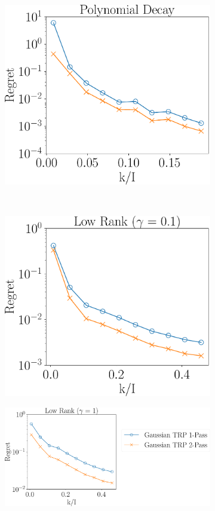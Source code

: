 \begin{figure}
\begin{subfigure}{0.3\textwidth}
		\includegraphics[scale = 0.24]{figure/fig3_spd_600.pdf}
	\end{subfigure}\\
	\begin{subfigure}{0.3\textwidth}
		\includegraphics[scale = 0.24]{figure/fig3_lk_mnoise_600.pdf}
	\end{subfigure}
	\begin{subfigure}{0.55\textwidth}
		\includegraphics[scale = 0.24]{figure/fig3_lk_hnoise_600.pdf}

\end{subfigure}
\end{figure}
